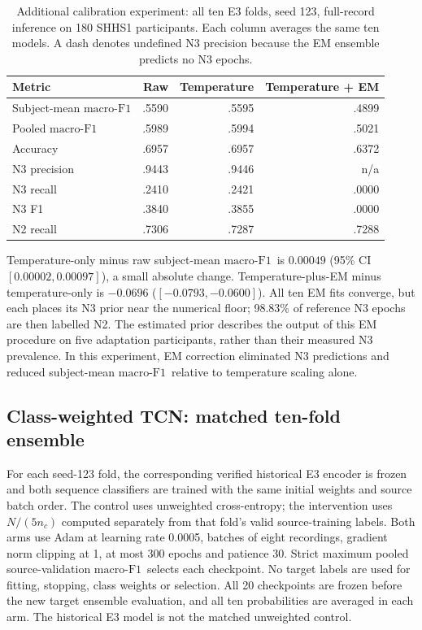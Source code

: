 \documentclass[10pt,a4paper]{article}
\newcommand{\mf}{\ensuremath{\mathrm{macro\text{-}F1}}}
\newcommand{\ci}{95\% CI}
\begin{document}
\begin{table}[H]
\centering\small
\caption{Additional calibration experiment: all ten E3 folds, seed 123, full-record inference
on 180 SHHS1 participants. Each column averages the same ten models. A dash denotes undefined
N3 precision because the EM ensemble predicts no N3 epochs.}
\label{tab:sup_calibration_intervention}
\begin{tabular}{lrrr}
\toprule
Metric & Raw & Temperature & Temperature + EM \\
\midrule
Subject-mean \mf & .5590 & .5595 & .4899 \\
Pooled \mf & .5989 & .5994 & .5021 \\
Accuracy & .6957 & .6957 & .6372 \\
N3 precision & .9443 & .9446 & n/a \\
N3 recall & .2410 & .2421 & .0000 \\
N3 F1 & .3840 & .3855 & .0000 \\
N2 recall & .7306 & .7287 & .7288 \\
\bottomrule
\end{tabular}
\end{table}

Temperature-only minus raw subject-mean \mf\ is $0.00049$ (\ci\ $[0.00002,0.00097]$),
a small absolute change. Temperature-plus-EM minus temperature-only is $-0.0696$
($[-0.0793,-0.0600]$). All ten EM fits converge, but each places its N3 prior near the numerical
floor; 98.83\% of reference N3 epochs are then labelled N2. The estimated prior describes
the output of this EM procedure on five adaptation participants, rather than their measured
N3 prevalence. In this experiment, EM correction eliminated N3 predictions and reduced
subject-mean \mf\ relative to temperature scaling alone.

\subsection*{Class-weighted TCN: matched ten-fold ensemble}

For each seed-123 fold, the corresponding verified historical E3 encoder is frozen and both
sequence classifiers are trained with the same initial weights and source batch order. The
control uses unweighted cross-entropy; the intervention uses $N/(5n_c)$ computed separately
from that fold's valid source-training labels. Both arms use Adam at learning rate 0.0005,
batches of eight recordings, gradient norm clipping at 1, at most 300 epochs and patience 30.
Strict maximum pooled source-validation \mf\ selects each checkpoint. No target labels are
used for fitting, stopping, class weights or selection. All 20 checkpoints are frozen before
the new target ensemble evaluation, and all ten probabilities are averaged in each arm.
The historical E3 model is not the matched unweighted control.
\end{document}
